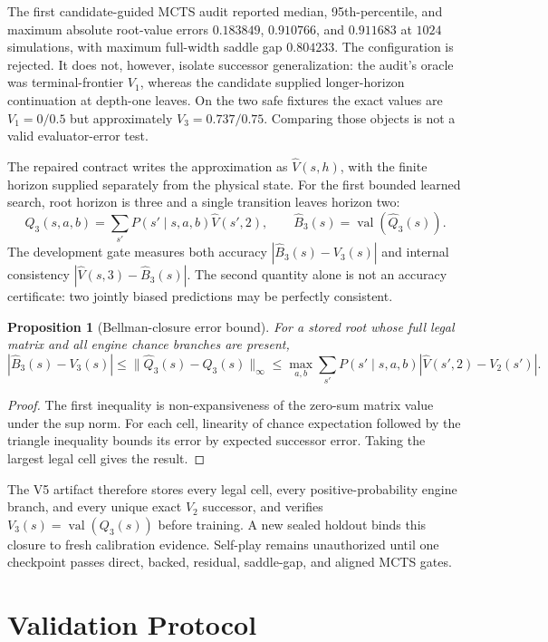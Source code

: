 \documentclass[11pt]{article}
\newtheorem{proposition}{Proposition}
\newcommand{\val}{\operatorname{val}}
\begin{document}
The first candidate-guided MCTS audit reported median, 95th-percentile, and
maximum absolute root-value errors $0.183849$, $0.910766$, and $0.911683$ at
$1024$ simulations, with maximum full-width saddle gap $0.804233$.  The
configuration is rejected.  It does not, however, isolate successor
generalization: the audit's oracle was terminal-frontier $V_1$, whereas the
candidate supplied longer-horizon continuation at depth-one leaves.  On the
two safe fixtures the exact values are $V_1=0/0.5$ but approximately
$V_3=0.737/0.75$.  Comparing those objects is not a valid evaluator-error test.

The repaired contract writes the approximation as $\widehat V(s,h)$, with
the finite horizon supplied separately from the physical state.  For the first
bounded learned search, root horizon is three and a single transition leaves
horizon two:
\[
 \widehat Q_3(s,a,b)
 =\sum_{s'}P(s'\mid s,a,b)\widehat V(s',2),\qquad
 \widehat B_3(s)=\val(\widehat Q_3(s)).
\]
The development gate measures both accuracy
$|\widehat B_3(s)-V_3(s)|$ and internal consistency
$|\widehat V(s,3)-\widehat B_3(s)|$.  The second quantity alone is not an
accuracy certificate: two jointly biased predictions may be perfectly
consistent.

\begin{proposition}[Bellman-closure error bound]
For a stored root whose full legal matrix and all engine chance branches are
present,
\[
 |\widehat B_3(s)-V_3(s)|
 \leq \|\widehat Q_3(s)-Q_3(s)\|_\infty
 \leq \max_{a,b}\sum_{s'}P(s'\mid s,a,b)
       |\widehat V(s',2)-V_2(s')|.
\]
\end{proposition}
\begin{proof}
The first inequality is non-expansiveness of the zero-sum matrix value under
the sup norm.  For each cell, linearity of chance expectation followed by the
triangle inequality bounds its error by expected successor error.  Taking the
largest legal cell gives the result.
\end{proof}

The V5 artifact therefore stores every legal cell, every positive-probability
engine branch, and every unique exact $V_2$ successor, and verifies
$V_3(s)=\val(Q_3(s))$ before training.  A new sealed holdout binds this closure
to fresh calibration evidence.  Self-play remains unauthorized until one
checkpoint passes direct, backed, residual, saddle-gap, and aligned MCTS gates.

\section{Validation Protocol}
\end{document}
